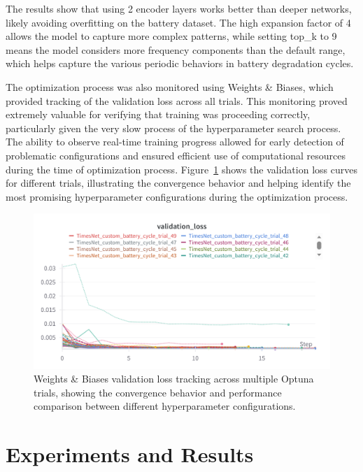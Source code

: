 The results show that using 2 encoder layers works better than deeper networks, likely avoiding overfitting on the battery dataset. The high expansion factor of 4 allows the model to capture more complex patterns, while setting top\_k to 9 means the model considers more frequency components than the default range, which helps capture the various periodic behaviors in battery degradation cycles.

The optimization process was also monitored using Weights \& Biases, which provided tracking of the validation loss across all trials. This monitoring proved extremely valuable for verifying that training was proceeding correctly, particularly given the very slow process of the hyperparameter search process. The ability to observe real-time training progress allowed for early detection of problematic configurations and ensured efficient use of computational resources during the time of optimization process. Figure~\ref{fig:wandb_validation_loss} shows the validation loss curves for different trials, illustrating the convergence behavior and helping identify the most promising hyperparameter configurations during the optimization process.

\begin{figure}[htbp]
    \centering
    \includegraphics[width=1.0\textwidth]{imgs/W&B_optimization_validation_loss.png}
    \caption{Weights \& Biases validation loss tracking across multiple Optuna trials, showing the convergence behavior and performance comparison between different hyperparameter configurations.}
    \label{fig:wandb_validation_loss}
\end{figure}

\chapter{Experiments and Results}
\label{sec:experiments_results}

